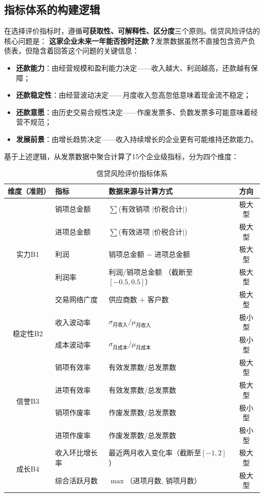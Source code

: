 \documentclass[12pt,a4paper]{ctexart}
\begin{document}
\subsection{指标体系的构建逻辑}

在选择评价指标时，遵循\textbf{可获取性、可解释性、区分度}三个原则。信贷风险评估的核心问题是：
\textbf{这家企业未来一年能否按时还款？}发票数据虽然不直接包含资产负债表，但隐含着回答这个问题的关键信息：

\begin{itemize}
    \item \textbf{还款能力}：由经营规模和盈利能力决定——收入越大、利润越高，还款越有保障；
    \item \textbf{还款稳定性}：由经营波动决定——月度收入忽高忽低意味着现金流不稳定；
    \item \textbf{还款意愿}：由历史交易合规性决定——作废发票多、负数发票多可能意味着经营不规范；
    \item \textbf{发展前景}：由增长趋势决定——收入持续增长的企业更有可能维持还款能力。
\end{itemize}

基于上述逻辑，从发票数据中聚合计算了15个企业级指标，分为四个维度：

\begin{table}[H]
\centering
\caption{信贷风险评价指标体系}
\label{tab:indicators}
\begin{tabular}{c|l|l|c}
\toprule
\textbf{维度（准则）} & \textbf{指标} & \textbf{数据来源与计算方式} & \textbf{方向} \\
\midrule
\multirow{5}{*}{实力B1}
  & 销项总金额    & $\sum$(有效销项 $|$价税合计$|$)   & 极大型 \\
  & 进项总金额    & $\sum$(有效进项 $|$价税合计$|$)   & 极大型 \\
  & 利润          & 销项总金额 $-$ 进项总金额        & 极大型 \\
  & 利润率        & 利润/销项总金额 （截断至$[-0.5,0.5]$）& 极大型 \\
  & 交易网络广度  & 供应商数 $+$ 客户数            & 极大型 \\
\midrule
\multirow{2}{*}{稳定性B2}
  & 收入波动率    & $\sigma_{\text{月收入}}/\mu_{\text{月收入}}$ & 极小型 \\
  & 成本波动率    & $\sigma_{\text{月成本}}/\mu_{\text{月成本}}$ & 极小型 \\
\midrule
\multirow{4}{*}{信誉B3}
  & 销项有效率    & 有效发票数/总发票数            & 极大型 \\
  & 进项有效率    & 有效发票数/总发票数            & 极大型 \\
  & 销项作废率    & 作废发票数/总发票数            & 极小型 \\
  & 进项作废率    & 作废发票数/总发票数            & 极小型 \\
\midrule
\multirow{2}{*}{成长B4}
  & 收入环比增长率 & 最近两月收入变化率（截断至$[-1,2]$）& 极大型 \\
  & 综合活跃月数   & $\max$（进项月数, 销项月数）  & 极大型 \\
\bottomrule
\end{tabular}
\end{table}
\end{document}
